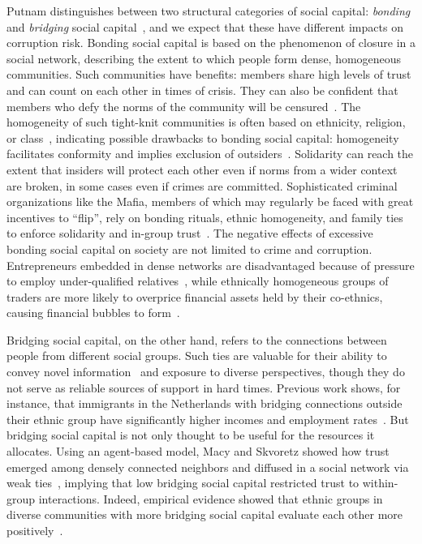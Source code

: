 Putnam distinguishes between two structural categories of social capital: \textit{bonding} and \textit{bridging} social capital~\cite{putnam2001bowling}, and we expect that these have different impacts on corruption risk. Bonding social capital is based on the phenomenon of closure in a social network, describing the extent to which people form dense, homogeneous communities. Such communities have benefits: members share high levels of trust and can count on each other in times of crisis. They can also be confident that members who defy the norms of the community will be censured~\cite{fearon1996explaining}. The homogeneity of such tight-knit communities is often based on ethnicity, religion, or class~\cite{coleman1988social}, indicating possible drawbacks to bonding social capital: homogeneity facilitates conformity and implies exclusion of outsiders~\cite{portes2000twomeanings}. Solidarity can reach the extent that insiders will protect each other even if norms from a wider context are broken, in some cases even if crimes are committed.  Sophisticated criminal organizations like the Mafia, members of which may regularly be faced with great incentives to ``flip'', rely on bonding rituals, ethnic homogeneity, and family ties to enforce solidarity and in-group trust~\cite{erickson1981secret,gambetta1996sicilian}. The negative effects of excessive bonding social capital on society are not limited to crime and corruption. Entrepreneurs embedded in dense networks are disadvantaged because of pressure to employ under-qualified relatives~\cite{geertz1963peddlers}, while ethnically homogeneous groups of traders are more likely to overprice financial assets held by their co-ethnics, causing financial bubbles to form~\cite{levine2014ethnic}.

Bridging social capital, on the other hand, refers to the connections between people from different social groups. Such ties are valuable for their ability to convey novel information~\cite{granovetter1977strength} and exposure to diverse perspectives, though they do not serve as reliable sources of support in hard times. Previous work shows, for instance, that immigrants in the Netherlands with bridging connections outside their ethnic group have significantly higher incomes and employment rates~\cite{lancee2010economic}. But bridging social capital is not only thought to be useful for the resources it allocates. Using an agent-based model, Macy and Skvoretz showed how trust emerged among densely connected neighbors and diffused in a social network via weak ties~\cite{macy1998evolution}, implying that low bridging social capital restricted trust to within-group interactions. Indeed, empirical evidence showed that ethnic groups in diverse communities with more bridging social capital evaluate each other more positively~\cite{laurence2009effect}.

